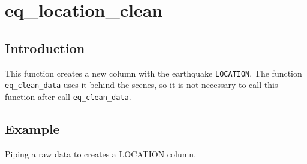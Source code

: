 \documentclass[]{book}
\begin{document}
\chapter{eq\_location\_clean}\label{eq_location_clean}

\section{Introduction}\label{intro}

This function creates a new column with the earthquake
\texttt{LOCATION}. The function \texttt{eq\_clean\_data} uses it behind
the scenes, so it is not necessary to call this function after call
\texttt{eq\_clean\_data}.

\section{Example}\label{example}

Piping a raw data to creates a LOCATION column.
\end{document}
